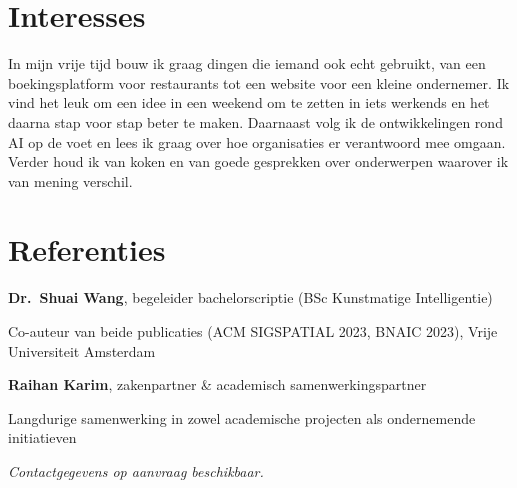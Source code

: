 \documentclass[10pt]{article}
\begin{document}
\section*{Interesses}
\vspace{-2pt}
{\small In mijn vrije tijd bouw ik graag dingen die iemand ook echt gebruikt, van een boekingsplatform voor restaurants tot een website voor een kleine ondernemer. Ik vind het leuk om een idee in een weekend om te zetten in iets werkends en het daarna stap voor stap beter te maken. Daarnaast volg ik de ontwikkelingen rond AI op de voet en lees ik graag over hoe organisaties er verantwoord mee omgaan. Verder houd ik van koken en van goede gesprekken over onderwerpen waarover ik van mening verschil.}

\section*{Referenties}
\vspace{1pt}
{\small
\textbf{Dr.\ Shuai Wang}, begeleider bachelorscriptie (BSc Kunstmatige Intelligentie)\par
Co-auteur van beide publicaties (ACM SIGSPATIAL 2023, BNAIC 2023), Vrije Universiteit Amsterdam\par\vspace{3pt}
\textbf{Raihan Karim}, zakenpartner \& academisch samenwerkingspartner\par
Langdurige samenwerking in zowel academische projecten als ondernemende initiatieven\par\vspace{3pt}
\textit{\color{gray} Contactgegevens op aanvraag beschikbaar.}
}
\end{document}
